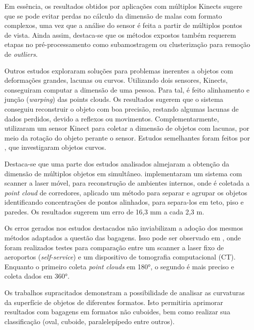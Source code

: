     Em essência, os resultados obtidos por aplicações com múltiplos Kinects sugere que se pode evitar perdas no cálculo da dimensão de malas com formato complexos, uma vez que a análise do sensor é feita a partir de múltiplos pontos de vista. Ainda assim, destaca-se que os métodos expostos também requerem etapas no pré-processamento como subamostragem ou clusterização para remoção de \textit{outliers}. 
    
    Outros estudos exploraram soluções para problemas inerentes a objetos com deformações grandes, lacunas ou curvos. Utilizando dois sensores, Kinects,  conseguiram computar a dimensão de uma pessoa. Para tal, é feito alinhamento e junção (\textit{warping}) das points clouds. Os resultados sugerem que o sistema conseguiu reconstruir o objeto com boa precisão, restando algumas lacunas de dados perdidos, devido a reflexos ou movimentos. Complementarmente,  utilizaram um sensor Kinect para coletar a dimensão de objetos com lacunas, por meio da rotação do objeto perante o sensor. Estudos semelhantes foram feitos por , que investigaram objetos curvos. 
    
    Destaca-se que uma parte dos estudos analisados almejaram a obtenção da dimensão de múltiplos objetos em simultâneo.  implementaram um sistema com scanner a laser móvel, para reconstrução de ambientes internos, onde é coletada a \textit{point cloud} de corredores, aplicado um método para separar e agrupar os objetos identificando concentrações de pontos alinhados, para separa-los em teto, piso e paredes. Os resultados sugerem um erro de 16,3 mm a cada 2,3 m. 
    
    Os erros gerados nos estudos destacados não inviabilizam a adoção dos mesmos métodos adaptados a questão das bagagens. Isso pode ser observado em , onde foram realizados testes para comparação entre um scanner a laser fixo de aeroportos (\textit{self-service}) e um dispositivo de tomografia computacional (CT). Enquanto o primeiro coleta \textit{point clouds} em 180°, o segundo é mais preciso e coleta dados em 360°. 
    
    Os trabalhos supracitados demonstram a possibilidade de analisar as curvaturas da superfície de objetos de diferentes formatos. Isto permitiria aprimorar resultados com bagagens em formatos não cuboides, bem como realizar sua classificação (oval, cuboide, paralelepípedo entre outros).



